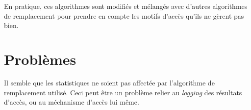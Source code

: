 \documentclass{article}
\begin{document}
En pratique, ces algorithmes sont modifiés et mélangés avec d'autres algorithmes de remplacement pour prendre en compte les motifs d'accès qu'ils ne gèrent pas bien.

\section{Problèmes}
Il semble que les statistiques ne soient pas affectée par l'algorithme de remplacement utilisé. Ceci peut être un problème relier au \emph{logging} des résultats d'accès, ou au méchanisme d'accès lui même.
\end{document}
